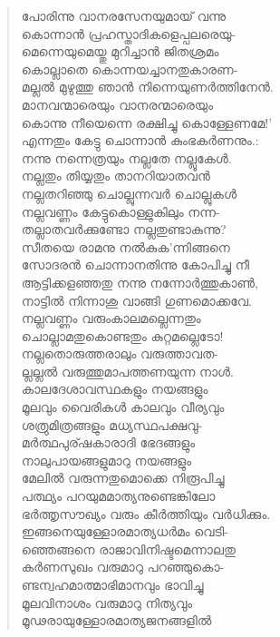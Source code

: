 \begin{verse}
പോരിന്നു വാനരസേനയുമായ് വന്നു\\
കൊന്നാന്‍ പ്രഹസ്താദികളെപ്പലരെയു-\\
മെന്നെയുമെയ്തു മുറിച്ചാന്‍ ജിതശ്രമം\\
കൊല്ലാതെ കൊന്നയച്ചാനതുകാരണ-\\
മല്ലല്‍ മുഴുത്തു ഞാന്‍ നിന്നെയുണര്‍ത്തിനേന്‍.\\
മാനവന്മാരെയും വാനരന്മാരെയും\\
കൊന്നു നീയെന്നെ രക്ഷിച്ചു കൊള്ളേണമേ!’\\
എന്നതും കേട്ടു ചൊന്നാന്‍ കുംഭകര്‍ണനും.:\\
നന്നു നന്നെത്രയും നല്ലതേ നല്ലൂകേള്‍.\\
നല്ലതും തിയ്യതും താനറിയാതവന്‍\\
നല്ലതറിഞ്ഞു ചൊല്ലുന്നവര്‍ ചൊല്ലുകള്‍\\
നല്ലവണ്ണം കേട്ടുകൊള്ളുകിലും നന്ന-\\
തല്ലാതവര്‍ക്കുണ്ടോ നല്ലതുണ്ടാകുന്നു?\\
സീതയെ രാമനു നല്‍കുക’ന്നിങ്ങനെ\\
സോദരന്‍ ചൊന്നാനതിന്നു കോപിച്ചു നീ\\
ആട്ടിക്കളഞ്ഞതു നന്നു നന്നോര്‍ത്തുകാണ്‍,\\
നാട്ടില്‍ നിന്നാശു വാങ്ങി ഗുണമൊക്കവേ.\\
നല്ലവണ്ണം വരുംകാലമല്ലെന്നതും\\
ചൊല്ലാമതുകൊണ്ടതും കുറ്റമല്ലെടോ!\\
നല്ലതൊരുത്തരാലും വരുത്താവത-\\
ല്ലല്ലല്‍ വരുത്തുമാപത്തണയുന്ന നാള്‍.\\
കാലദേശാവസ്ഥകളും നയങ്ങളും\\
മൂലവും വൈരികള്‍ കാലവും വീര്യവും\\
ശത്രുമിത്രങ്ങളും മധ്യസ്ഥപക്ഷവു-\\
മര്‍ത്ഥപുര്ഷകാരാദി ഭേദങ്ങളും\\
നാലുപായങ്ങളുമാറു നയങ്ങളും\\
മേലില്‍ വരുന്നതുമൊക്കെ നിരൂപിച്ചു\\
പത്ഥ്യം പറയുമമാത്യനുണ്ടെങ്കിലോ\\
ഭര്‍ത്തൃസൗഖ്യം വരും കീര്‍ത്തിയും വര്‍ധിക്കും.\\
ഇങ്ങനെയുള്ളോരമാത്യധര്‍മം വെടി-\\
ഞ്ഞെങ്ങനെ രാജാവിനിഷ്ടമെന്നാലതു\\
കര്‍ണസുഖം വരുമാറു പറഞ്ഞുകൊ-\\
ണ്ടന്വഹമാത്മാഭിമാനവും ഭാവിച്ചു\\
മൂലവിനാശം വരുമാറു നിത്യവും\\
മൂഢരായുള്ളോരമാത്യജനങ്ങളില്‍\\

\end{verse}
